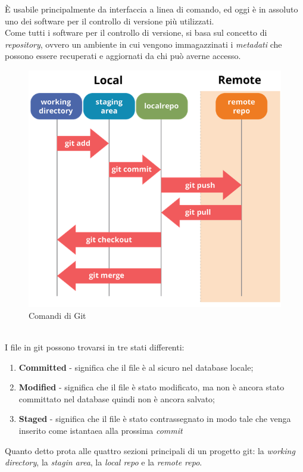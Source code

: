È usabile principalmente da interfaccia a linea di comando, ed oggi è in assoluto uno dei software per il controllo di versione più utilizzati.\\
Come tutti i software per il controllo di versione, si basa sul concetto di \emph{\gls{repository}}\glsfirstoccur\cite{gitSite}, ovvero un ambiente in cui vengono immagazzinati i \emph{\gls{metadati}}\glsfirstoccur\cite{gitGuida} che possono essere recuperati e aggiornati da chi può averne accesso.
\begin{figure}[h]
	\centering
	\includegraphics[scale=0.5]{immagini/gitCommands}
	\caption{Comandi di Git \cite{gitGuida}}
\end{figure}
\\
I file in \gls{git} possono trovarsi in tre stati differenti:
\begin{enumerate}
	\item \textbf{Committed} - significa che il file è al sicuro nel database locale;
	\item \textbf{Modified} - significa che il file è stato modificato, ma non è ancora stato committato nel database quindi non è ancora salvato;
	\item \textbf{Staged} - significa che il file è stato contrassegnato in modo tale che venga inserito come istantaea alla prossima \emph{\gls{commit}}\glsfirstoccur
\end{enumerate}
Quanto detto prota alle quattro sezioni principali di un progetto \gls{git}: la \textit{working directory}, la \textit{stagin area}, la \textit{local repo} e la \textit{remote repo}.

